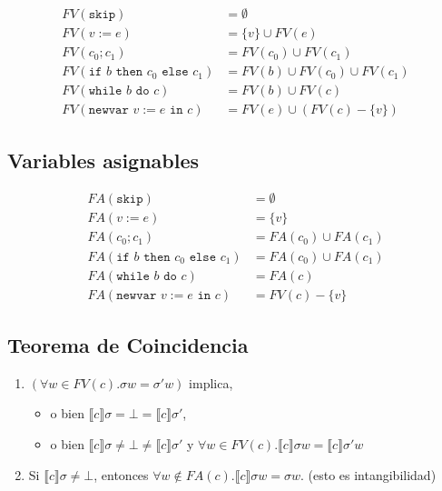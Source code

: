 \documentclass[a4paper,11pt]{article}
\begin{document}
\begin{align*}
FV(\texttt{skip}) &= \emptyset \\
FV(v := e) &= \{v\} \cup FV(e) \\
FV(c_0 ; c_1) &= FV(c_0) \cup FV(c_1) \\
FV(\texttt{if } b \texttt{ then } c_0 \texttt{ else } c_1) &= FV(b) \cup FV(c_0) \cup FV(c_1) \\
FV(\texttt{while } b \texttt{ do } c) &= FV(b) \cup FV(c) \\
FV(\texttt{newvar } v := e \texttt{ in } c) &= FV(e) \cup (FV(c) - \{v\})
\end{align*}

\subsection{Variables asignables}

\begin{align*}
FA(\texttt{skip}) &= \emptyset \\
FA(v := e) &= \{v\} \\
FA(c_0 ; c_1) &= FA(c_0) \cup FA(c_1) \\
FA(\texttt{if } b \texttt{ then } c_0 \texttt{ else } c_1) &= FA(c_0) \cup FA(c_1) \\
FA(\texttt{while } b \texttt{ do } c) &= FA(c) \\
FA(\texttt{newvar } v := e \texttt{ in } c) &= FV(c) - \{v\}
\end{align*}

\subsection{Teorema de Coincidencia}

\begin{enumerate}
    \item $(\forall w \in FV(c). \sigma w = \sigma' w)$ implica,
    \begin{itemize}
        \item o bien $\llbracket c \rrbracket \sigma = \bot = \llbracket c \rrbracket \sigma'$,
        \item o bien $\llbracket c \rrbracket \sigma \neq \bot \neq \llbracket c \rrbracket \sigma'$ y $\forall w \in FV(c). \llbracket c \rrbracket \sigma w = \llbracket c \rrbracket \sigma' w$
    \end{itemize}
    \item Si $\llbracket c \rrbracket \sigma \neq \bot$, entonces $\forall w \notin FA(c). \llbracket c \rrbracket \sigma w = \sigma w$. (esto es intangibilidad)
\end{enumerate}
\end{document}
